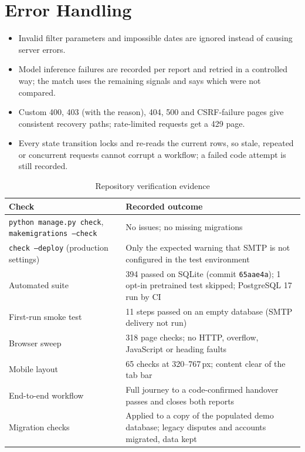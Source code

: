 \documentclass[12pt,a4paper,oneside]{report}
\newcommand{\code}[1]{\texttt{#1}}
\begin{document}
\section{Error Handling}
\begin{itemize}
  \item Invalid filter parameters and impossible dates are ignored instead of causing server errors.
  \item Model inference failures are recorded per report and retried in a controlled way; the match uses the remaining signals and says which were not compared.
  \item Custom 400, 403 (with the reason), 404, 500 and CSRF-failure pages give consistent recovery paths; rate-limited requests get a 429 page.
  \item Every state transition locks and re-reads the current rows, so stale, repeated or concurrent requests cannot corrupt a workflow; a failed code attempt is still recorded.
\end{itemize}

\begin{table}[H]
\centering\small
\caption{Repository verification evidence}
\begin{tabularx}{\textwidth}{P{46mm}X}
\toprule
Check & Recorded outcome\\
\midrule
\code{python manage.py check}, \code{makemigrations --check} & No issues; no missing migrations\\
\code{check --deploy} (production settings) & Only the expected warning that SMTP is not configured in the test environment\\
Automated suite & 394 passed on SQLite (commit \code{65aae4a}); 1 opt-in pretrained test skipped; PostgreSQL 17 run by CI\\
First-run smoke test & 11 steps passed on an empty database (SMTP delivery not run)\\
Browser sweep & 318 page checks; no HTTP, overflow, JavaScript or heading faults\\
Mobile layout & 65 checks at 320--767\,px; content clear of the tab bar\\
End-to-end workflow & Full journey to a code-confirmed handover passes and closes both reports\\
Migration checks & Applied to a copy of the populated demo database; legacy disputes and accounts migrated, data kept\\
\bottomrule
\end{tabularx}
\end{table}
\end{document}
